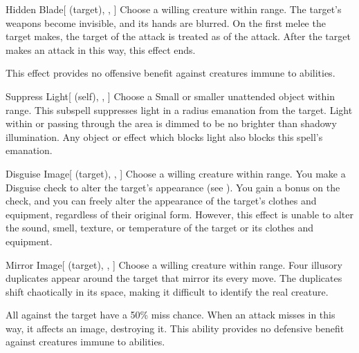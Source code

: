 \begin{ability}[\nth{1}]{Hidden Blade}[ (target), , ]
Choose a willing creature within \rngclose range.
The target's weapons become invisible, and its hands are blurred.
On the first melee  the target makes, the target of the attack is treated as  of the attack.
After the target makes an attack in this way, this effect ends.

This effect provides no offensive benefit against creatures immune to  abilities.
\end{ability}
\vspace{0.25em}



\begin{ability}[\nth{1}]{Suppress Light}[ (self), , ]
Choose a Small or smaller unattended object within \rngclose range.
This subspell suppresses light in a \areamed radius emanation from the target.
Light within or passing through the area is dimmed to be no brighter than shadowy illumination.
Any object or effect which blocks light also blocks this spell's emanation.
\end{ability}
\vspace{0.25em}



\begin{ability}[\nth{2}]{Disguise Image}[ (target), , ]
Choose a willing creature within \rngclose range.
You make a Disguise check to alter the target's appearance (see ).
You gain a  bonus on the check, and you can freely alter the appearance of the target's clothes and equipment, regardless of their original form.
However, this effect is unable to alter the sound, smell, texture, or temperature of the target or its clothes and equipment.
\end{ability}
\vspace{0.25em}



\begin{ability}[\nth{2}]{Mirror Image}[ (target), , ]
Choose a willing creature within \rngclose range.
Four illusory duplicates appear around the target that mirror its every move.
The duplicates shift chaotically in its space, making it difficult to identify the real creature.

All   against the target have a 50\% miss chance.
When an attack misses in this way, it affects an image, destroying it.
This ability provides no defensive benefit against creatures immune to  abilities.
\end{ability}
\vspace{0.25em}



